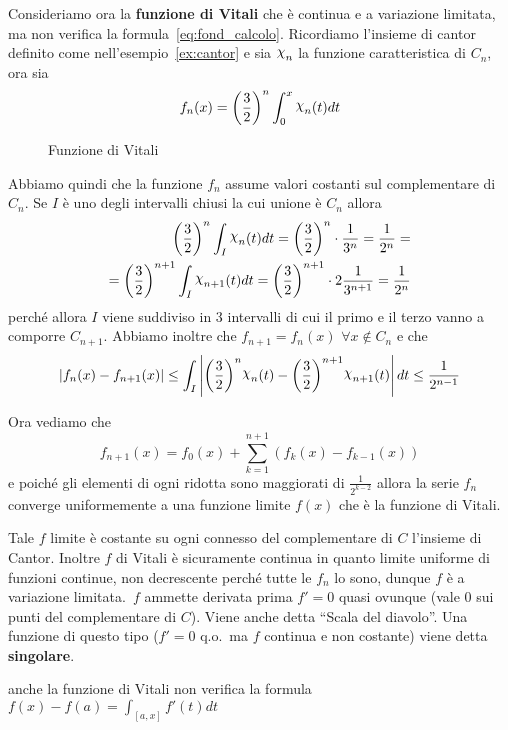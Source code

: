 Consideriamo ora la \textbf{funzione di Vitali} che è continua e a variazione
limitata, ma non verifica la formula~\eqref{eq:fond_calcolo}. Ricordiamo
l'insieme di cantor definito come nell'esempio~\ref{ex:cantor} e sia \(\rchi_n\)
la funzione caratteristica di \(C_n\), ora sia
\[
    f_{n}{(x)} = {\left( \frac{3}{2} \right)} ^{n} \int_{0} ^{x}\rchi_n{(t)}dt
\]
\begin{figure}[ht]
    \centering
    \caption{Funzione di Vitali}\label{fig:funzione-cantor}
\end{figure}
Abbiamo quindi che la funzione \(f_{n}\) assume valori costanti sul
complementare di \(C_{n}\). Se \(I\) è uno degli intervalli chiusi la cui unione
è \(C_{n}\) allora
\begin{align*}
    {\left( \frac{3}{2} \right)} ^{n} \int_I \rchi_n{(t)}dt = {\left(
    \frac{3}{2} \right)} ^{n} \cdot \frac{1}{3^{n}} = \frac{1}{2^{n}} = \\
    = {\left( \frac{3}{2} \right)}^{n+1} \int_{I}  \rchi_{n+1}{(t)}dt = {\left(
    \frac{3}{2}\right)}^{n+1} \cdot 2 \frac{1}{3^{n+1}} = \frac{1}{2^{n}}
\end{align*}
perché allora \(I\) viene suddiviso in 3 intervalli di cui il primo e il terzo vanno
a comporre \(C_{n+1}\).
Abbiamo inoltre che \(f_{n+1} = f_{n}{(x)} \,\,\forall x \not\in C_{n}\) e che
\[
    |f_{n}{(x)} - f_{n+1} {(x)}| \le  \int_I \left| {\left( \frac{3}{2} \right)}
    ^{n} \rchi_n {(t)}  - {\left( \frac{3}{2} \right)} ^{n+1} \rchi_{n+1}
    {(t)}\right| dt \le \frac{1}{2^{n-1}}
\]

Ora vediamo che
\[
    f_{n+1} {(x)} = f_{0} {(x)} + \sum_{k=1}^{n+1} {\left( f_k{(x)} - f_{k-1}
    {(x)} \right)}  
\]
e poiché gli elementi di ogni ridotta sono maggiorati di \(\frac{1}{2^{k-2}}\)
allora la serie \(f_{n}\) converge uniformemente a una funzione limite \(f{(x)}\) 
che è la funzione di Vitali.

Tale \(f\) limite è costante su ogni connesso del complementare di \(C\)
l'insieme di Cantor. Inoltre \(f\) di Vitali è sicuramente continua in quanto
limite uniforme di funzioni continue, non decrescente perché tutte le \(f_{n}\)
lo sono, dunque \(f\) è a variazione limitata.~\(f\) ammette derivata prima \(f'
= 0\) quasi ovunque (vale 0 sui punti del complementare di  \(C\)). Viene anche
detta ``Scala del diavolo''. Una funzione di questo tipo (\(f'=0\) q.o.~ma \(f\)
continua e non costante) viene detta \textbf{singolare}.
\begin{note}
    anche la funzione di Vitali non verifica la formula \(f{(x)} - f{(a)} =
    \int_{[a,x]} f'{(t)} dt\) 
\end{note}

